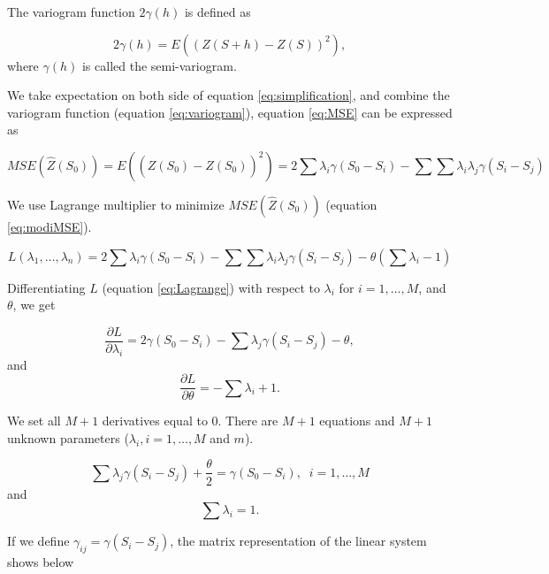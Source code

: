 \documentclass{article}
\begin{document}
The variogram function $2\gamma(h)$ is defined as

\begin{equation}\label{eq:variogram}
2\gamma(h)=E((Z(S+h)-Z(S))^2),
\end{equation} 
where $\gamma(h)$ is called the semi-variogram.


We take expectation on both side of equation \ref{eq:simplification},  and combine the variogram function (equation \ref{eq:variogram}), equation \ref{eq:MSE} can be expressed as

\begin{equation}\label{eq:modiMSE}
MSE(\widehat{Z}(S_0))=E((Z(S_0)-\widehat{Z}(S_0))^2) = 2\sum\lambda_i\gamma(S_0-S_i) - \sum\sum\lambda_i\lambda_j\gamma(S_i-S_j)
\end{equation}

We use Lagrange multiplier to minimize $MSE(\widehat{Z}(S_0))$ (equation \ref{eq:modiMSE}).  

\begin{equation}\label{eq:Lagrange}
L(\lambda_1,\dots,\lambda_n) = 2\sum\lambda_i\gamma(S_0-S_i) - \sum\sum\lambda_i\lambda_j\gamma(S_i-S_j) - \theta\left(\sum\lambda_i-1\right)
\end{equation}

Differentiating $L$ (equation \ref{eq:Lagrange}) with respect to $\lambda_i$ for $i=1,\dots,M$, and $\theta$, we get

\begin{equation}
\frac{\partial L}{\partial \lambda_i} = 2\gamma(S_0-S_i) - \sum\lambda_j\gamma(S_i-S_j) - \theta,
\end{equation}
and
\begin{equation}
\frac{\partial L}{\partial \theta} =  -\sum\lambda_i +1.
\end{equation}

We set all $M+1$ derivatives equal to 0. There are $M+1$ equations and $M+1$ unknown parameters ($\lambda_i, i=1,\dots,M$ and $m$). 

\begin{equation}
\sum\lambda_j\gamma(S_i-S_j) + \frac{\theta}{2} =\gamma(S_0-S_i),\;\;i=1,\dots,M
\end{equation}
and
\begin{equation}
\sum\lambda_i = 1.
\end{equation}

If we define $\gamma_{ij}=\gamma(S_i-S_j)$, the matrix representation of the linear system  shows below
\end{document}
